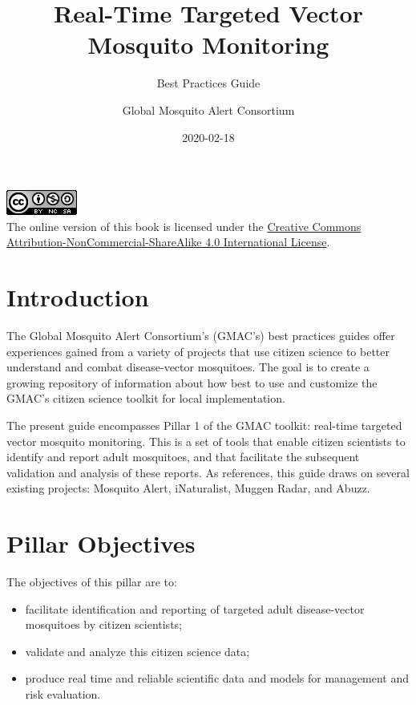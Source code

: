 \documentclass[]{article}
\title{Real-Time Targeted Vector Mosquito Monitoring}
\subtitle{Best Practices Guide}
\author{Global Mosquito Alert Consortium}
\date{2020-02-18}
\providecommand{\tightlist}{%
  \setlength{\itemsep}{0pt}\setlength{\parskip}{0pt}}
\begin{document}
\maketitle

{
\setcounter{tocdepth}{2}
\tableofcontents
}
\hypertarget{section}{%
\section*{}\label{section}}

\includegraphics{images/by-nc-sa.png}\\
The online version of this book is licensed under the \href{http://creativecommons.org/licenses/by-nc-sa/4.0/}{Creative Commons Attribution-NonCommercial-ShareAlike 4.0 International License}.

\hypertarget{intro}{%
\section{Introduction}\label{intro}}

The Global Mosquito Alert Consortium's (GMAC's) best practices guides offer experiences gained from a variety of projects that use citizen science to better understand and combat disease-vector mosquitoes. The goal is to create a growing repository of information about how best to use and customize the GMAC's citizen science toolkit for local implementation.

The present guide encompasses Pillar 1 of the GMAC toolkit: real-time targeted vector mosquito monitoring. This is a set of tools that enable citizen scientists to identify and report adult mosquitoes, and that facilitate the subsequent validation and analysis of these reports. As references, this guide draws on several existing projects: Mosquito Alert, iNaturalist, Muggen Radar, and Abuzz.

\hypertarget{objectives}{%
\section{Pillar Objectives}\label{objectives}}

The objectives of this pillar are to:

\begin{itemize}
\tightlist
\item
  facilitate identification and reporting of targeted adult disease-vector mosquitoes by citizen scientists;
\item
  validate and analyze this citizen science data;
\item
  produce real time and reliable scientific data and models for management and risk evaluation.
\end{itemize}
\end{document}
